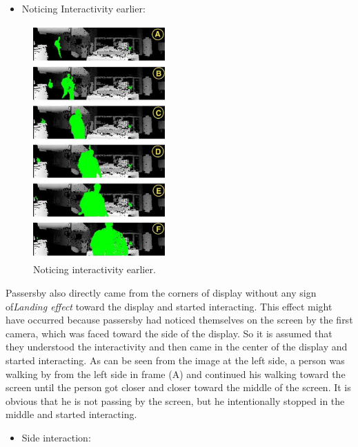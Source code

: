 \begin{itemize}
\item Noticing Interactivity earlier:
\end{itemize}


\begin{figure}
  \vspace{-30pt}
  \begin{center}
    \includegraphics[width=0.45\textwidth,height=90mm]{Figures/9/effects/noticing_earlier}
  \end{center}
  \vspace{-20pt}
  \caption{Noticing interactivity earlier.}
  \vspace{-60pt}
\end{figure}
Passersby also directly came from the corners of display without any sign of\emph{Landing effect} toward the display and started interacting. This effect might have occurred because passersby had noticed themselves on the screen by the first camera, which was faced toward the side of the display. So it is assumed that they understood the interactivity and then came in the center of the display and started interacting. As can be seen from the image at the left side, a person was walking by from the left side in frame (A) and continued his walking toward the screen until the person got closer and closer toward the middle of the screen. It is obvious that he is not passing by the screen, but he intentionally stopped in the middle and started interacting. 
\break


\begin{itemize}

\item Side interaction:

\end{itemize}


